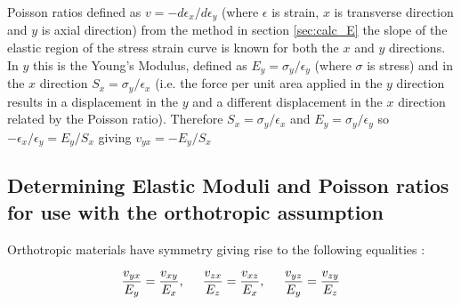 \documentclass[10pt]{article}
\begin{document}
Poisson ratios defined as \(v = -d\epsilon_x /d\epsilon_y \)  \citep{bodig_jozsef_jayne_mechanics_1982} (where \(\epsilon\) is strain, \(x\) is transverse direction and \(y\) is axial direction) from the method in section \ref{sec:calc_E} the slope of the elastic region of the stress strain curve is known for both the \(x\) and \(y\) directions. In \(y\) this is the Young's Modulus, defined as \(E_y = \sigma_y / \epsilon_y\) (where \(\sigma\) is stress)  \citep{bodig_jozsef_jayne_mechanics_1982} and in the \(x\) direction \(S_x = \sigma_y / \epsilon_x\) (i.e. the force per unit area applied in the \(y\) direction results in a displacement in the \(y\) and a different displacement in the \(x\) direction related by the Poisson ratio). Therefore \(S_x = \sigma_y / \epsilon_x \) and \(E_y = \sigma_y / \epsilon_y\) so \(-\epsilon_x / \epsilon_y = E_y/S_x\) giving \(v_{yx} = -E_y/S_x\)

\subsection{Determining Elastic Moduli and Poisson ratios for use with the orthotropic assumption}
\label{sec:orthotropic_assumption}
Orthotropic materials have symmetry giving rise to the following equalities \citep{salencon_handbook_2001}:

\begin{equation}\label{eqn:equalities}
\frac{v_{yx}}{E_y}=\frac{v_{xy}}{E_x},\hspace{0.5cm} \frac{v_{zx}}{E_z}=\frac{v_{xz}}{E_x},\hspace{0.5cm} \frac{v_{yz}}{E_y}=\frac{v_{zy}}{E_z}
\end{equation}
\end{document}
